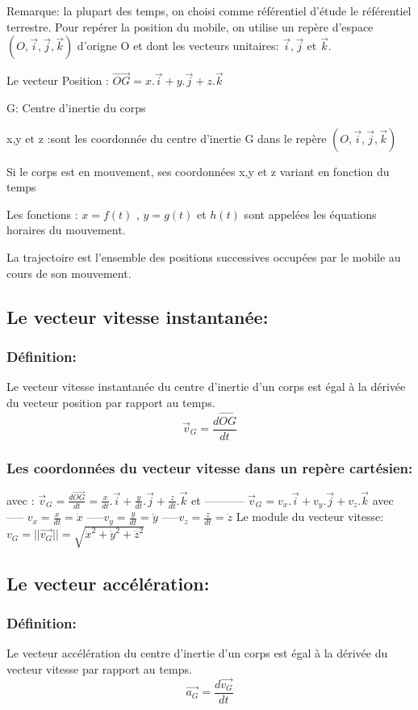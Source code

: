 \documentclass[12pt]{article}
\begin{document}
\begin{tcolorbox}
Remarque: la plupart des temps, on choisi comme référentiel d'étude le référentiel terrestre.
Pour repérer la position du mobile, on utilise un repère d'espace $(O,\vec{i} , \vec{j}, \vec{k} )$
d'origne O et dont les vecteurs unitaires: $\vec{i} , \vec{j}$ et  $\vec{k}$.

Le vecteur Position : $\vec{OG} = x.\vec{i}+y.\vec{j}+z.\vec{k}$

G: Centre d'inertie du corps

x,y et z :sont les coordonnée du centre d'inertie G dans le repère $(O,\vec{i} , \vec{j}, \vec{k} )$

Si le corps est en mouvement, ses coordonnées x,y et z variant en fonction du temps


Les fonctions : $x=f(t)$ , $y=g(t)$ et $h(t)$ sont appelées les équations horaires du mouvement.

La trajectoire est l'ensemble des positions successives occupées par le mobile au cours de son mouvement.
\end{tcolorbox}

\subsection{Le vecteur vitesse instantanée:}
\subsubsection{Définition:}
Le vecteur vitesse instantanée du centre d'inertie d'un corps est égal à la dérivée du vecteur position par rapport au
temps. $$\vec{v}_G = \frac{d\vec{OG}}{dt}$$
\subsubsection{Les coordonnées du vecteur vitesse dans un repère cartésien:}
avec : $\vec{v}_G = \frac{d\vec{OG}}{dt} = \frac{x}{dt}.\vec{i} + \frac{y}{dt}.\vec{j} + \frac{z}{dt}.\vec{k}$  et -----------  $\vec{v}_G = v_x.\vec{i} + v_y.\vec{j} + v_z.\vec{k}$ avec ----- $v_x = \frac{x}{dt} = \dot{x}$
-----$v_y = \frac{y}{dt} = \dot{y}$
-----$v_z = \frac{z}{dt} = \dot{z}$
Le module du vecteur vitesse: $v_G = ||\vec{v_G}|| = \sqrt{\dot{x}^2 + \dot{y}^2 + \dot{z}^2 }$

\subsection{Le vecteur accélération:}
\subsubsection{Définition:}
Le vecteur accélération du centre d'inertie d'un corps est égal à la dérivée du vecteur vitesse par rapport au temps.
 $$\vec{a_G} = \frac{d\vec{v_G}}{dt}$$
\end{document}
